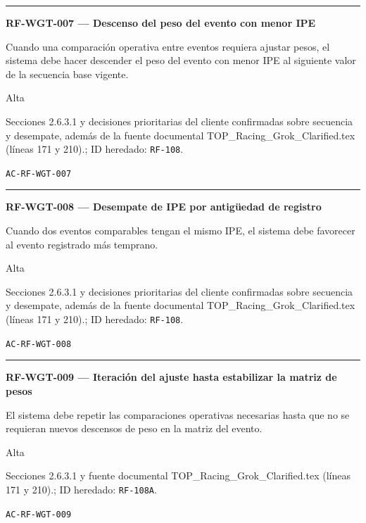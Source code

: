 \documentclass[10pt,letterpaper]{article}
\begin{document}
\vspace{0.25em}\hrule\vspace{0.65em}
\noindent\textbf{RF-WGT-007 --- Descenso del peso del evento con menor IPE}\par
\begin{description}[style=nextline,leftmargin=3.15cm,labelwidth=2.8cm,font=\normalfont\bfseries]
\item[Obligación] Cuando una comparación operativa entre eventos requiera ajustar pesos, el sistema debe hacer descender el peso del evento con menor IPE al siguiente valor de la secuencia base vigente.
\item[Prioridad] Alta
\item[Procedencia] Secciones 2.6.3.1 y decisiones prioritarias del cliente confirmadas sobre secuencia y desempate, además de la fuente documental TOP\_Racing\_Grok\_Clarified.tex (líneas 171 y 210).; ID heredado: \texttt{RF-108}.
\item[Verificación] \texttt{AC-RF-WGT-007}
\end{description}
\vspace{0.25em}\hrule\vspace{0.65em}
\noindent\textbf{RF-WGT-008 --- Desempate de IPE por antigüedad de registro}\par
\begin{description}[style=nextline,leftmargin=3.15cm,labelwidth=2.8cm,font=\normalfont\bfseries]
\item[Obligación] Cuando dos eventos comparables tengan el mismo IPE, el sistema debe favorecer al evento registrado más temprano.
\item[Prioridad] Alta
\item[Procedencia] Secciones 2.6.3.1 y decisiones prioritarias del cliente confirmadas sobre secuencia y desempate, además de la fuente documental TOP\_Racing\_Grok\_Clarified.tex (líneas 171 y 210).; ID heredado: \texttt{RF-108}.
\item[Verificación] \texttt{AC-RF-WGT-008}
\end{description}
\vspace{0.25em}\hrule\vspace{0.65em}
\noindent\textbf{RF-WGT-009 --- Iteración del ajuste hasta estabilizar la matriz de pesos}\par
\begin{description}[style=nextline,leftmargin=3.15cm,labelwidth=2.8cm,font=\normalfont\bfseries]
\item[Obligación] El sistema debe repetir las comparaciones operativas necesarias hasta que no se requieran nuevos descensos de peso en la matriz del evento.
\item[Prioridad] Alta
\item[Procedencia] Secciones 2.6.3.1 y fuente documental TOP\_Racing\_Grok\_Clarified.tex (líneas 171 y 210).; ID heredado: \texttt{RF-108A}.
\item[Verificación] \texttt{AC-RF-WGT-009}
\end{description}
\end{document}
